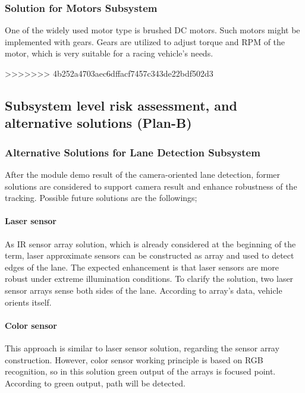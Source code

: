 \documentclass[a4paper,12pt]{article}
\begin{document}
			
		\subsubsection{Solution for Motors Subsystem}
			
			One of the widely used motor type is brushed DC motors. Such motors might be implemented with gears. Gears are utilized to adjust torque and RPM of the motor, which is very suitable for a racing vehicle's needs. \\

			
	\newpage
	
	
		
>>>>>>> 4b252a4703aec6dffacf7457c343de22bdf502d3
	\subsection{Subsystem level risk assessment, and alternative solutions (Plan-B)}
	
	
		\subsubsection{Alternative Solutions for Lane Detection Subsystem}
		
			After the module demo result of the camera-oriented lane detection, former solutions are considered to support camera result and enhance robustness of the tracking. Possible future solutions are the followings;  
			
			\paragraph{Laser sensor}
				As IR sensor array solution, which is already considered at the beginning of the term, laser approximate sensors can be constructed as array and used to detect edges of the lane. The expected enhancement is that laser sensors are more robust under extreme illumination conditions. To clarify the solution, two laser sensor arrays sense both sides of the lane. According to array’s data, vehicle orients itself.  


			\paragraph{Color sensor}
				This approach is similar to laser sensor solution, regarding the sensor array construction. However, color sensor working principle is based on RGB recognition, so in this solution green output of the arrays is focused point. According to green output, path will be detected.
\end{document}
